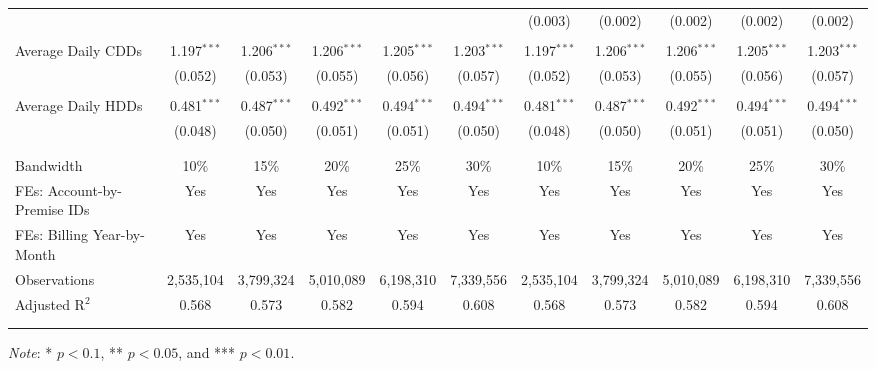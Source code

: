 {\begin{table}[t!]
\begin{adjustbox}{scale = 0.8}
\begin{threeparttable}
\begin{tabular}{@{\extracolsep{-1.5pt}}lcccccccccc}
                      &  &  &  &  &  & (0.003) & (0.002) & (0.002) & (0.002) & (0.002) \\ 
                      & & & & & & & & & & \\ 
                     Average Daily CDDs & 1.197$^{***}$ & 1.206$^{***}$ & 1.206$^{***}$ & 1.205$^{***}$ & 1.203$^{***}$ & 1.197$^{***}$ & 1.206$^{***}$ & 1.206$^{***}$ & 1.205$^{***}$ & 1.203$^{***}$ \\ 
                      & (0.052) & (0.053) & (0.055) & (0.056) & (0.057) & (0.052) & (0.053) & (0.055) & (0.056) & (0.057) \\ 
                      & & & & & & & & & & \\ 
                     Average Daily HDDs & 0.481$^{***}$ & 0.487$^{***}$ & 0.492$^{***}$ & 0.494$^{***}$ & 0.494$^{***}$ & 0.481$^{***}$ & 0.487$^{***}$ & 0.492$^{***}$ & 0.494$^{***}$ & 0.494$^{***}$ \\ 
                      & (0.048) & (0.050) & (0.051) & (0.051) & (0.050) & (0.048) & (0.050) & (0.051) & (0.051) & (0.050) \\ 
                      & & & & & & & & & & \\
                    \hline
                    \\[-2.0ex]
                    Bandwidth & 10\% & 15\% & 20\% & 25\% & 30\% & 10\% & 15\% & 20\% & 25\% & 30\% \\ 
                    FEs: Account-by-Premise IDs & Yes & Yes & Yes & Yes & Yes & Yes & Yes & Yes & Yes & Yes \\ 
                    FEs: Billing Year-by-Month & Yes & Yes & Yes & Yes & Yes & Yes & Yes & Yes & Yes & Yes \\ 
                    Observations & 2,535,104 & 3,799,324 & 5,010,089 & 6,198,310 & 7,339,556 & 2,535,104 & 3,799,324 & 5,010,089 & 6,198,310 & 7,339,556 \\ 
                    Adjusted R$^{2}$ & 0.568 & 0.573 & 0.582 & 0.594 & 0.608 & 0.568 & 0.573 & 0.582 & 0.594 & 0.608 \\
                    \\[-2.0ex]
                    \hline \hline
                    \\[-4.5ex]
                \end{tabular}
                \begin{tablenotes}[flushleft]
                    \footnotesize
                    \item \textit{Note}: * $p < 0.1$, ** $p < 0.05$, and *** $p < 0.01$.
                \end{tablenotes}
            \end{threeparttable}
        \end{adjustbox}
    \end{table}
}
